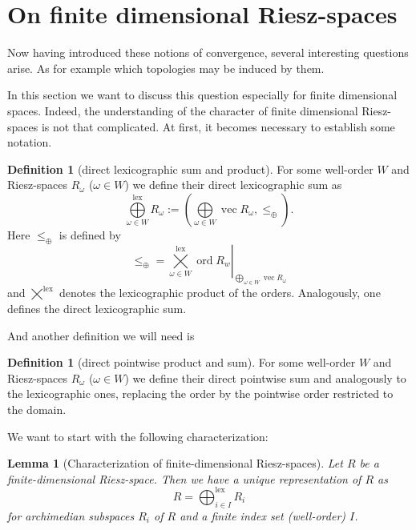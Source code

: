 \message{ !name(OnOrderConvergence.tex)}\documentclass{article}
\newtheorem{lemma}[theorem]{Lemma}
\theoremstyle{definition}
\newtheorem{definition}[theorem]{Definition}
\theoremstyle{remark}
\newcommand{\setprod}{\bigtimes}
\newcommand{\dirsum}{\bigoplus} %
\newcommand{\dirplus}{\oplus}
\newcommand{\rest}[1]{\left. #1\right\vert}
\DeclareMathOperator{\vecspace}{vec} %
\DeclareMathOperator{\ord}{ord} %
\DeclareMathOperator{\lex}{lex}
\begin{document}
\section{On finite dimensional Riesz-spaces}

Now having introduced these notions of convergence, several interesting questions arise. As for example which topologies may be induced by them.

In this section we want to discuss this question especially for finite dimensional spaces.
Indeed, the understanding of the character of finite dimensional Riesz-spaces is not that complicated. 
At first, it becomes necessary to establish some notation. 

\begin{definition}[direct lexicographic sum and product]
For some well-order $W$ and Riesz-spaces $R_\omega$ ($\omega\in W$) we define their direct lexicographic sum as
\begin{equation}
\dirsum\limits^{\lex}_{\omega\in W}{R_\omega} := \left(\dirsum\limits_{\omega\in W}{\vecspace{R_\omega}},\leq_{\dirplus}\right)\text{.}
\end{equation}
Here $\leq_{\dirplus}$ is defined by 
\begin{equation}
\leq_{\dirplus} = \rest{\setprod\limits^{\lex}_{\omega\in W}{\ord{R_w}}}_{\dirsum\limits_{\omega\in W}{\vecspace{R_\omega}}}
\end{equation}
and $\bigtimes\limits^{\lex}$ denotes the lexicographic product of the orders. Analogously, one defines the direct lexicographic sum.
\end{definition}

And another definition we will need is  

\begin{definition}[direct pointwise product and sum]
For some well-order $W$ and Riesz-spaces $R_\omega$ ($\omega\in W$) we define their direct pointwise sum and analogously to the lexicographic ones, replacing the order by the pointwise order restricted to the domain.
\end{definition}

We want to start with the following characterization:

\begin{lemma}[Characterization of finite-dimensional Riesz-spaces]\label{chargen}
Let $R$ be a finite-dimensional Riesz-space. Then we have a unique representation
of $R$ as
\begin{equation}
R = \dirsum^{\lex}_{i\in I}{R_i}
\end{equation}
for archimedian subspaces $R_i$ of $R$ and a finite index set (well-order) $I$.
\end{lemma}
\end{document}
